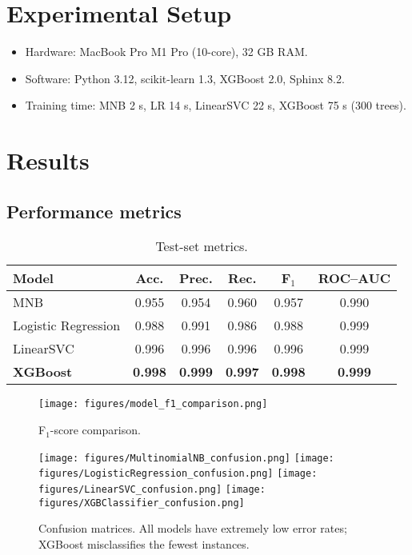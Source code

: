 \documentclass[11pt]{article}
\begin{document}
\section{Experimental Setup}
\begin{itemize}[itemsep=0pt]
\item Hardware: MacBook Pro M1 Pro (10-core), 32 GB RAM.
\item Software: Python 3.12, scikit-learn 1.3, XGBoost 2.0, Sphinx 8.2.
\item Training time: MNB 2 s, LR 14 s, LinearSVC 22 s,
      XGBoost 75 s (300 trees).
\end{itemize}

\section{Results}
\subsection{Performance metrics}
\begin{table}[h]
\centering
\begin{tabular}{lccccc}
\toprule
Model & Acc. & Prec. & Rec. & F$_1$ & ROC–AUC \\
\midrule
MNB                 & 0.955 & 0.954 & 0.960 & 0.957 & 0.990 \\
Logistic Regression & 0.988 & 0.991 & 0.986 & 0.988 & 0.999 \\
LinearSVC           & 0.996 & 0.996 & 0.996 & 0.996 & 0.999 \\
\textbf{XGBoost}    & \textbf{0.998} & \textbf{0.999} & \textbf{0.997}
                    & \textbf{0.998} & \textbf{0.999} \\
\bottomrule
\end{tabular}
\caption{Test-set metrics.}
\label{tab:metrics}
\end{table}

\begin{figure}[h]
\centering
\texttt{[image: figures/model\_f1\_comparison.png]}
\caption{F$_1$-score comparison.}
\end{figure}

\begin{figure}[h]
\centering
\texttt{[image: figures/MultinomialNB\_confusion.png]}
\texttt{[image: figures/LogisticRegression\_confusion.png]}
\texttt{[image: figures/LinearSVC\_confusion.png]}
\texttt{[image: figures/XGBClassifier\_confusion.png]}
\caption{Confusion matrices.  All models have extremely low error rates;
XGBoost misclassifies the fewest instances.}
\end{figure}
\end{document}
